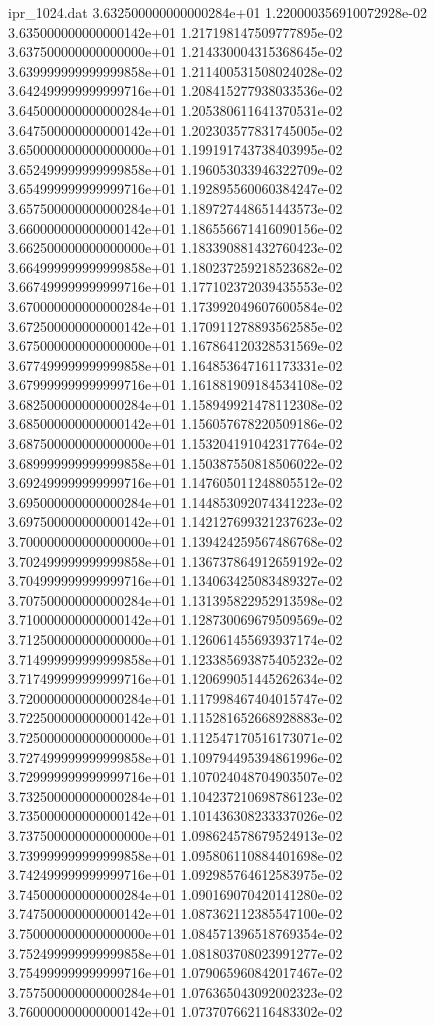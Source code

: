 \begin{filecontents}{ipr_1024.dat}
3.632500000000000284e+01 1.220000356910072928e-02
3.635000000000000142e+01 1.217198147509777895e-02
3.637500000000000000e+01 1.214330004315368645e-02
3.639999999999999858e+01 1.211400531508024028e-02
3.642499999999999716e+01 1.208415277938033536e-02
3.645000000000000284e+01 1.205380611641370531e-02
3.647500000000000142e+01 1.202303577831745005e-02
3.650000000000000000e+01 1.199191743738403995e-02
3.652499999999999858e+01 1.196053033946322709e-02
3.654999999999999716e+01 1.192895560060384247e-02
3.657500000000000284e+01 1.189727448651443573e-02
3.660000000000000142e+01 1.186556671416090156e-02
3.662500000000000000e+01 1.183390881432760423e-02
3.664999999999999858e+01 1.180237259218523682e-02
3.667499999999999716e+01 1.177102372039435553e-02
3.670000000000000284e+01 1.173992049607600584e-02
3.672500000000000142e+01 1.170911278893562585e-02
3.675000000000000000e+01 1.167864120328531569e-02
3.677499999999999858e+01 1.164853647161173331e-02
3.679999999999999716e+01 1.161881909184534108e-02
3.682500000000000284e+01 1.158949921478112308e-02
3.685000000000000142e+01 1.156057678220509186e-02
3.687500000000000000e+01 1.153204191042317764e-02
3.689999999999999858e+01 1.150387550818506022e-02
3.692499999999999716e+01 1.147605011248805512e-02
3.695000000000000284e+01 1.144853092074341223e-02
3.697500000000000142e+01 1.142127699321237623e-02
3.700000000000000000e+01 1.139424259567486768e-02
3.702499999999999858e+01 1.136737864912659192e-02
3.704999999999999716e+01 1.134063425083489327e-02
3.707500000000000284e+01 1.131395822952913598e-02
3.710000000000000142e+01 1.128730069679509569e-02
3.712500000000000000e+01 1.126061455693937174e-02
3.714999999999999858e+01 1.123385693875405232e-02
3.717499999999999716e+01 1.120699051445262634e-02
3.720000000000000284e+01 1.117998467404015747e-02
3.722500000000000142e+01 1.115281652668928883e-02
3.725000000000000000e+01 1.112547170516173071e-02
3.727499999999999858e+01 1.109794495394861996e-02
3.729999999999999716e+01 1.107024048704903507e-02
3.732500000000000284e+01 1.104237210698786123e-02
3.735000000000000142e+01 1.101436308233337026e-02
3.737500000000000000e+01 1.098624578679524913e-02
3.739999999999999858e+01 1.095806110884401698e-02
3.742499999999999716e+01 1.092985764612583975e-02
3.745000000000000284e+01 1.090169070420141280e-02
3.747500000000000142e+01 1.087362112385547100e-02
3.750000000000000000e+01 1.084571396518769354e-02
3.752499999999999858e+01 1.081803708023991277e-02
3.754999999999999716e+01 1.079065960842017467e-02
3.757500000000000284e+01 1.076365043092002323e-02
3.760000000000000142e+01 1.073707662116483302e-02

\end{filecontents}
